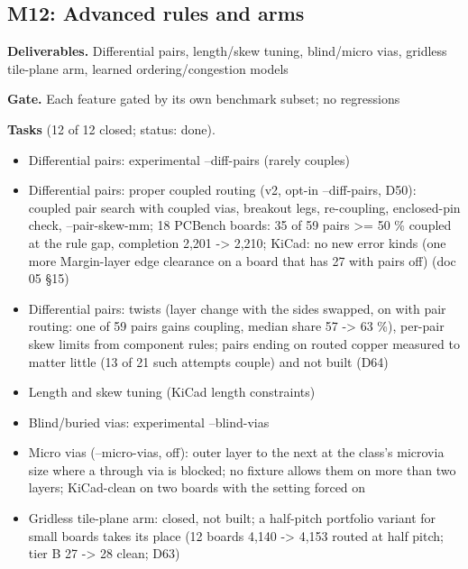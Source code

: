 \subsection*{M12: Advanced rules and arms}
\noindent\textbf{Deliverables.} Differential pairs, length/skew tuning, blind/micro vias, gridless tile-plane arm, learned ordering/congestion models\par\smallskip
\noindent\textbf{Gate.} Each feature gated by its own benchmark subset; no regressions\par\smallskip
\noindent\textbf{Tasks} (12 of 12 closed; status: done).
\begin{itemize}[leftmargin=1.6em,itemsep=1pt]
\item[\textcolor{fraqua}{$\checkmark$}] Differential pairs: experimental --diff-pairs (rarely couples)
\item[\textcolor{fraqua}{$\checkmark$}] Differential pairs: proper coupled routing (v2, opt-in --diff-pairs, D50): coupled pair search with coupled vias, breakout legs, re-coupling, enclosed-pin check, --pair-skew-mm; 18 PCBench boards: 35 of 59 pairs \textgreater{}= 50 \% coupled at the rule gap, completion 2,201 -\textgreater{} 2,210; KiCad: no new error kinds (one more Margin-layer edge clearance on a board that has 27 with pairs off) (doc 05 \S15)
\item[\textcolor{fraqua}{$\checkmark$}] Differential pairs: twists (layer change with the sides swapped, on with pair routing: one of 59 pairs gains coupling, median share 57 -\textgreater{} 63 \%), per-pair skew limits from component rules; pairs ending on routed copper measured to matter little (13 of 21 such attempts couple) and not built (D64)
\item[\textcolor{fraqua}{$\checkmark$}] Length and skew tuning (KiCad length constraints)
\item[\textcolor{fraqua}{$\checkmark$}] Blind/buried vias: experimental --blind-vias
\item[\textcolor{fraqua}{$\checkmark$}] Micro vias (--micro-vias, off): outer layer to the next at the class's microvia size where a through via is blocked; no fixture allows them on more than two layers; KiCad-clean on two boards with the setting forced on
\item[\textcolor{fraqua}{$\checkmark$}] Gridless tile-plane arm: closed, not built; a half-pitch portfolio variant for small boards takes its place (12 boards 4,140 -\textgreater{} 4,153 routed at half pitch; tier B 27 -\textgreater{} 28 clean; D63)

\end{itemize}
